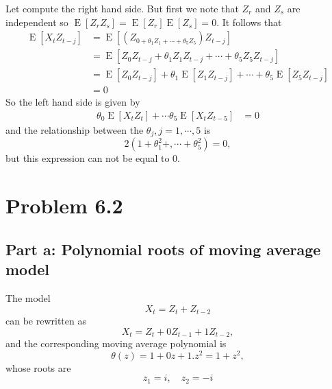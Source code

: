 \documentclass[11pt, oneside]{article}   	%
\newcommand{\E}{\operatorname{E}}
\begin{document}
Let compute the right hand side. But first we note that $Z_{r}$ and $Z_{s}$ are independent so $\E[Z_{r}Z_{s}] = \E[Z_{r}]\E[Z_{s}] = 0$. It follows that
\begin{equation}
\begin{split}
\E[X_{t}Z_{t-j}] &= \E[(Z_{0 + \theta_{1}Z_{1}+\cdots+\theta_{5}Z_{5}})Z_{t-j}]\\
&=\E[Z_{0}Z_{t-j} + \theta_{1}Z_{1}Z_{t-j}+\cdots+\theta_{5}Z_{5}Z_{t-j}]\\
&=\E[Z_{0}Z_{t-j}] + \theta_{1}\E[Z_{1}Z_{t-j}]+\cdots+\theta_{5}\E[Z_{5}Z_{t-j}]\\
&=0
\end{split}
\end{equation}
So the left hand side is given by
\begin{equation}
\begin{split}
\theta_{0}\E[X_{t}Z_{t}] + \cdots \theta_{5}\E[X_{t}Z_{t-5}]&=0
\end{split}
\end{equation}
and the relationship between the $\theta_{j}, j = 1, \cdots, 5$ is 
\begin{equation}
2(1+\theta_{1}^{2} +, \cdots+\theta_{5}^{2}) = 0,
\end{equation}
but this expression can not be equal to 0. 


 \section{Problem 6.2}
 \subsection{Part a: Polynomial roots of moving average model}
 The model
 \begin{equation}
 X_{t} = Z_{t} + Z_{t-2}
 \end{equation}
 can be rewritten as 
 \begin{equation}
 X_{t} = Z_{t} + 0Z_{t-1} + 1Z_{t-2},
 \end{equation}
 and the corresponding moving average polynomial is
 \begin{equation}
 \theta(z) = 1+ 0z + 1.z^{2} = 1 + z^{2},
 \end{equation}
 whose roots are 
 \begin{equation}
 z_{1} = i, \quad z_{2} = -i
 \end{equation}
\end{document}
